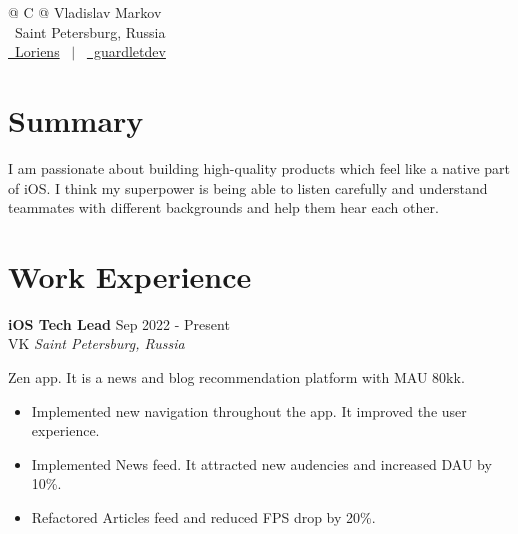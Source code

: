 \documentclass[a4paper,10pt]{article}
\begin{document}
\pagestyle{empty} 



\begin{tabularx}{\linewidth}{@{} C @{}}
\Huge{Vladislav Markov} \\[7.5pt]
\raisebox{-0.05\height}\faMapMarker \ Saint Petersburg, Russia \\[2.5pt]
\href{https://github.com/username}{\raisebox{-0.05\height}\faGithub\ Loriens} \ $|$ \ 
\href{https://linkedin.com/in/username}{\raisebox{-0.05\height}\faLinkedin\ guardletdev} \ 
\end{tabularx}


\section{Summary}
I am passionate about building high-quality products which feel like a native part of iOS.
I think my superpower is being able to listen carefully and understand teammates with different backgrounds and help them hear each other.

\section{Work Experience}

\textbf{iOS Tech Lead} \hfill Sep 2022 - Present \\
VK \hfill \textit{Saint Petersburg, Russia}

Zen app. It is a news and blog recommendation platform with MAU 80kk.
 \begin{itemize}
    \itemsep -5pt {} 
     \item Implemented new navigation throughout the app. It improved the user experience.
     \item Implemented News feed. It attracted new audencies and increased DAU by 10\%.
     \item Refactored Articles feed and reduced FPS drop by 20\%.
 \end{itemize}
\end{document}
